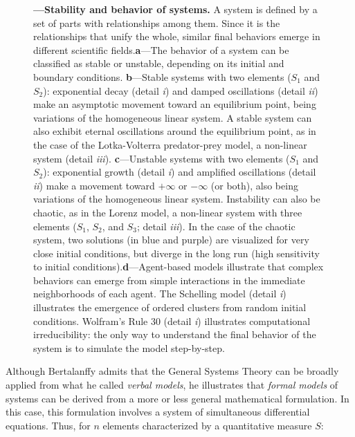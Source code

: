\documentclass[./main_en.tex]{subfiles}
\begin{document}
\begin{figure}[t!]
	{\textbf{---\;Stability and behavior of systems.} A \gls{system} is defined by a set of parts with relationships among them. Since it is the relationships that unify the whole, similar final behaviors emerge in different scientific fields.\;\textbf{a}\;---\;The behavior of a \gls{system} can be classified as stable or unstable, depending on its initial and boundary conditions. \;\textbf{b}\;---\;Stable systems with two elements ($S_1$ and $S_2$): exponential decay (detail \textrm{\textit{i}}) and damped oscillations (detail \textrm{\textit{ii}}) make an asymptotic movement toward an equilibrium point, being variations of the homogeneous linear \gls{system}. A stable \gls{system} can also exhibit eternal oscillations around the equilibrium point, as in the case of the Lotka-Volterra predator-prey \gls{model}, a non-linear \gls{system} (detail \textrm{\textit{iii}}). \;\textbf{c}\;---\;Unstable systems with two elements ($S_1$ and $S_2$): exponential growth (detail \textrm{\textit{i}}) and amplified oscillations (detail \textrm{\textit{ii}}) make a movement toward $+\infty$ or $-\infty$ (or both), also being variations of the homogeneous linear \gls{system}. Instability can also be chaotic, as in the Lorenz \gls{model}, a non-linear \gls{system} with three elements ($S_1$, $S_2$, and $S_3$; detail \textrm{\textit{iii}}). In the case of the chaotic \gls{system}, two solutions (in blue and purple) are visualized for very close initial conditions, but diverge in the long run (high sensitivity to initial conditions).\;\textbf{d}\;---\;Agent-based models illustrate that complex behaviors can emerge from simple interactions in the immediate neighborhoods of each agent. The Schelling \gls{model} (detail \textrm{\textit{i}}) illustrates the emergence of ordered clusters from random initial conditions. Wolfram's Rule 30 (detail \textrm{\textit{i}}) illustrates computational irreducibility: the only way to understand the final behavior of the \gls{system} is to simulate the \gls{model} step-by-step.
	}
\label{fig:sys:systems}  %
\end{figure}

\par Although Bertalanffy admits that the General Systems Theory can be broadly applied from what he called \textit{verbal models}, he illustrates that \textit{formal models} of systems can be derived from a more or less general mathematical formulation. In this case, this formulation involves a \gls{system} of simultaneous differential equations. Thus, for $n$ elements characterized by a quantitative measure $S$:
\end{document}
